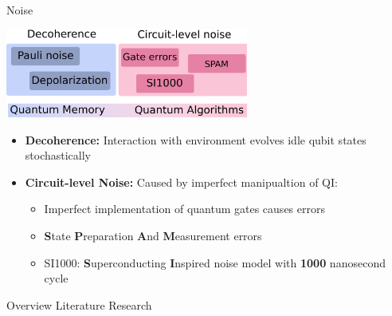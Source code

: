 \documentclass{dfki}
\begin{document}
\begin{frame}{Noise}
	\begin{center}
        \includegraphics[width=0.6\textwidth]{fig/NoiseTypes.png}
    \end{center}
	\small
	\begin{itemize}
		\item \textbf{Decoherence:} Interaction with environment evolves idle qubit states stochastically
		\item \textbf{Circuit-level Noise:} Caused by imperfect manipualtion of QI:
		\begin{itemize}
			\item Imperfect implementation of quantum gates causes errors
			\item \textbf{S}tate \textbf{P}reparation \textbf{A}nd \textbf{M}easurement errors
			\item SI1000: \textbf{S}uperconducting \textbf{I}nspired noise model with \textbf{1000} nanosecond cycle
		\end{itemize}
	\end{itemize}
	\pause
	\begin{overlayarea}{\textwidth}{3cm}
	\vspace{-8cm}
	\hspace{3.5cm}
	\end{overlayarea}
\end{frame}


\begin{frame}{Overview Literature Research}
	\begin{center}
		\begin{itemize}
			\vspace{0.5cm}
			\pause
			\vspace{0.5cm}
			\pause
			\vspace{0.5cm}
			\pause
		\end{itemize}
	\end{center}
\end{frame}
\end{document}
